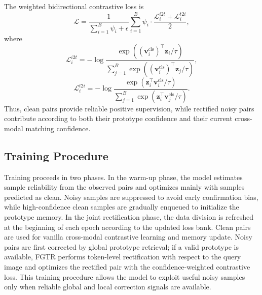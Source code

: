The weighted bidirectional contrastive loss is
\begin{equation}
    \mathcal{L}
    =
    \frac{1}{\sum_{i=1}^{B}\psi_i+\epsilon}
    \sum_{i=1}^{B}
    \psi_i\cdot
    \frac{\mathcal{L}_{i}^{i2t}+\mathcal{L}_{i}^{t2i}}{2},
\end{equation}
where
\begin{equation}
    \mathcal{L}_{i}^{i2t}
    =
    -\log
    \frac{\exp((\boldsymbol{v}_{i}^{\mathrm{cls}})^{\top}\boldsymbol{z}_i/\tau)}
    {\sum_{j=1}^{B}\exp((\boldsymbol{v}_{i}^{\mathrm{cls}})^{\top}\boldsymbol{z}_j/\tau)},
\end{equation}
\begin{equation}
    \mathcal{L}_{i}^{t2i}
    =
    -\log
    \frac{\exp(\boldsymbol{z}_i^{\top}\boldsymbol{v}_{i}^{\mathrm{cls}}/\tau)}
    {\sum_{j=1}^{B}\exp(\boldsymbol{z}_i^{\top}\boldsymbol{v}_{j}^{\mathrm{cls}}/\tau)}.
\end{equation}
Thus, clean pairs provide reliable positive supervision, while rectified noisy pairs contribute according to both their prototype confidence and their current cross-modal matching confidence.

\subsection{Training Procedure}
Training proceeds in two phases. In the warm-up phase, the model estimates sample reliability from the observed pairs and optimizes mainly with samples predicted as clean. Noisy samples are suppressed to avoid early confirmation bias, while high-confidence clean samples are gradually enqueued to initialize the prototype memory. In the joint rectification phase, the data division is refreshed at the beginning of each epoch according to the updated loss bank. Clean pairs are used for vanilla cross-modal contrastive learning and memory update. Noisy pairs are first corrected by global prototype retrieval; if a valid prototype is available, FGTR performs token-level rectification with respect to the query image and optimizes the rectified pair with the confidence-weighted contrastive loss. This training procedure allows the model to exploit useful noisy samples only when reliable global and local correction signals are available.
